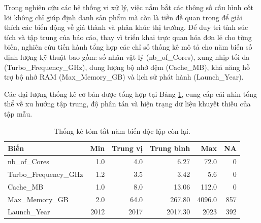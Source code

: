 \documentclass[12pt, a4paper]{article}
\begin{document}
Trong nghiên cứu các hệ thống vi xử lý, việc nắm bắt các thông số cấu hình cốt lõi không chỉ giúp định danh sản phẩm mà còn là tiền đề quan trọng để giải thích các biến động về giá thành và phân khúc thị trường. Để duy trì tính súc tích và tập trung của báo cáo, thay vì triển khai trực quan hóa đơn lẻ cho từng biến, nghiên cứu tiến hành tổng hợp các chỉ số thống kê mô tả cho năm biến số định lượng kỹ thuật bao gồm: số nhân vật lý (nb\_of\_Cores), xung nhịp tối đa (Turbo\_Frequency\_GHz), dung lượng bộ nhớ đệm (Cache\_MB), khả năng hỗ trợ bộ nhớ RAM (Max\_Memory\_GB) và lịch sử phát hành (Launch\_Year).

Các đại lượng thống kê cơ bản được tổng hợp tại Bảng \ref{tab:summary_stats}, cung cấp cái nhìn tổng thể về xu hướng tập trung, độ phân tán và hiện trạng dữ liệu khuyết thiếu của tập mẫu.

\begin{table}[H]
    \centering
    \caption{Thống kê tóm tắt năm biến độc lập còn lại.}
    \label{tab:summary_stats}
    \begin{tabular}{|l|r|r|r|r|r|}
        \hline
        \textbf{Biến} & \textbf{Min} & \textbf{Trung vị} & \textbf{Trung bình} & \textbf{Max} & \textbf{NA} \\
        \hline
        nb\_of\_Cores & 1.0 & 4.0 & 6.27 & 72.0 & 0 \\
        Turbo\_Frequency\_GHz & 1.2 & 3.5 & 3.42 & 5.6 & 0 \\
        Cache\_MB & 1.0 & 8.0 & 13.06 & 112.0 & 0 \\
        Max\_Memory\_GB & 2.0 & 64.0 & 267.80 & 4096.0 & 857 \\
        Launch\_Year & 2012 & 2017 & 2017.30 & 2023 & 392 \\
        \hline
    \end{tabular}
\end{table}
\end{document}
